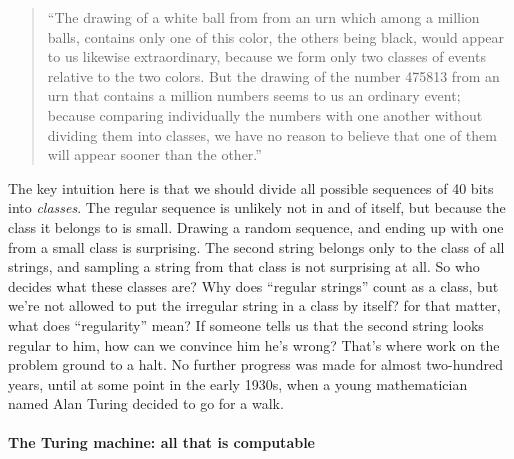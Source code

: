 
\begin{quote}
``The drawing of a white ball from from an urn which among a million balls, contains only one of this color, the others being black, would appear to us likewise extraordinary, because we form only two classes of events relative to the two colors. But the drawing of the number 475813 from an urn that contains a million numbers seems to us an ordinary event; because comparing individually the numbers with one another without dividing them into classes, we have no reason to believe that one of them will appear sooner than the other.'' \cite{laplace1951philosophical}
\end{quote}

The key intuition here is that we should divide all possible sequences of 40 bits into \emph{classes}. The regular sequence is unlikely not in and of itself, but because the class it belongs to is small. Drawing a random sequence, and ending up with one from a small class is surprising. The second string belongs only to the class of all strings, and sampling a string from that class is not surprising at all.
So who decides what these classes are? Why does ``regular strings'' count as a class, but we're not allowed to put the irregular string in a class by itself? for that matter, what does ``regularity'' mean? If someone tells us that the second string looks regular to him, how can we convince him he's wrong? That's where work on the problem ground to a halt. No further progress was made for almost two-hundred years, until at some point in the early 1930s, when a young mathematician named Alan Turing decided to go for a walk.

\paragraph{The Turing machine: all that is computable}

